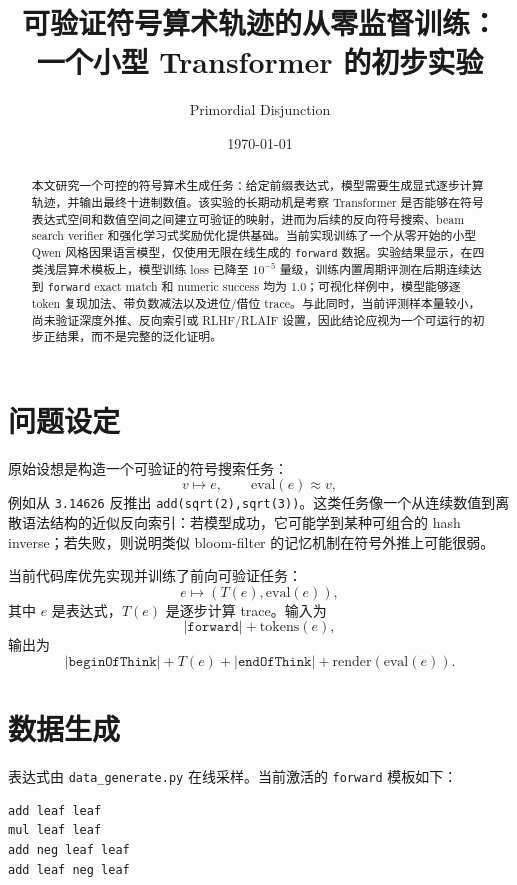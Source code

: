\documentclass[UTF8,a4paper,11pt]{ctexart}
\title{可验证符号算术轨迹的从零监督训练：\\一个小型 Transformer 的初步实验}
\author{Primordial Disjunction}
\date{\today}
\begin{document}
\maketitle

\begin{abstract}
本文研究一个可控的符号算术生成任务：给定前缀表达式，模型需要生成显式逐步计算轨迹，并输出最终十进制数值。该实验的长期动机是考察 Transformer 是否能够在符号表达式空间和数值空间之间建立可验证的映射，进而为后续的反向符号搜索、beam search verifier 和强化学习式奖励优化提供基础。当前实现训练了一个从零开始的小型 Qwen 风格因果语言模型，仅使用无限在线生成的 \texttt{forward} 数据。实验结果显示，在四类浅层算术模板上，模型训练 loss 已降至 $10^{-5}$ 量级，训练内置周期评测在后期连续达到 \texttt{forward} exact match 和 numeric success 均为 1.0；可视化样例中，模型能够逐 token 复现加法、带负数减法以及进位/借位 trace。与此同时，当前评测样本量较小，尚未验证深度外推、反向索引或 RLHF/RLAIF 设置，因此结论应视为一个可运行的初步正结果，而不是完整的泛化证明。
\end{abstract}

\section{问题设定}

原始设想是构造一个可验证的符号搜索任务：
\[
  v \mapsto e,\qquad \mathrm{eval}(e) \approx v,
\]
例如从 \texttt{3.14626} 反推出 \texttt{add(sqrt(2),sqrt(3))}。这类任务像一个从连续数值到离散语法结构的近似反向索引：若模型成功，它可能学到某种可组合的 hash inverse；若失败，则说明类似 bloom-filter 的记忆机制在符号外推上可能很弱。

当前代码库优先实现并训练了前向可验证任务：
\[
  e \mapsto (T(e), \mathrm{eval}(e)),
\]
其中 $e$ 是表达式，$T(e)$ 是逐步计算 trace。输入为
\[
  \texttt{|forward|} + \mathrm{tokens}(e),
\]
输出为
\[
  \texttt{|beginOfThink|} + T(e) + \texttt{|endOfThink|} + \mathrm{render}(\mathrm{eval}(e)).
\]

\section{数据生成}

表达式由 \texttt{data\_generate.py} 在线采样。当前激活的 \texttt{forward} 模板如下：

\begin{lstlisting}[style=trace]
add leaf leaf
mul leaf leaf
add neg leaf leaf
add leaf neg leaf
\end{lstlisting}
\end{document}

